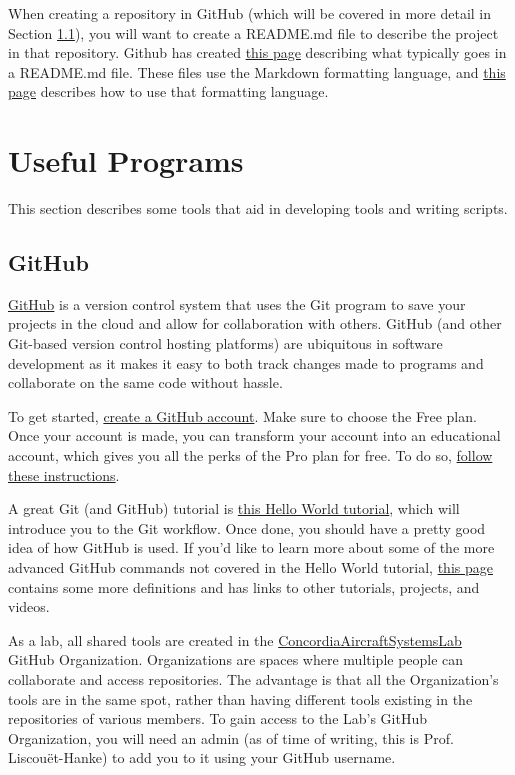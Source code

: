 \documentclass[letterpaper, 12pt]{article}
\begin{document}
When creating a repository in GitHub (which will be covered in more detail in Section \ref{github}), you will want to create a README.md file to describe the project in that repository. Github has created \href{https://help.github.com/en/github/creating-cloning-and-archiving-repositories/about-readmes}{this page} describing what typically goes in a README.md file. These files use the Markdown formatting language, and \href{https://help.github.com/en/github/writing-on-github/basic-writing-and-formatting-syntax}{this page} describes how to use that formatting language.

\section{Useful Programs}
This section describes some tools that aid in developing tools and writing scripts.
\subsection{GitHub}\label{github}
\href{https://github.com/}{GitHub} is a version control system that uses the Git program to save your projects in the cloud and allow for collaboration with others. GitHub (and other Git-based version control hosting platforms) are ubiquitous in software development as it makes it easy to both track changes made to programs and collaborate on the same code without hassle.

To get started, \href{https://github.com/join}{create a GitHub account}. Make sure to choose the Free plan. Once your account is made, you can transform your account into an educational account, which gives you all the perks of the Pro plan for free. To do so, \href{https://help.github.com/en/github/teaching-and-learning-with-github-education/applying-for-a-student-developer-pack}{follow these instructions}.

A great Git (and GitHub) tutorial is \href{https://guides.github.com/activities/hello-world/}{this Hello World tutorial}, which will introduce you to the Git workflow. 
Once done, you should have a pretty good idea of how GitHub is used. If you'd like to learn more about some of the more advanced GitHub commands not covered in the Hello World tutorial, \href{https://guides.github.com/introduction/git-handbook/}{this page} contains some more definitions and has links to other tutorials, projects, and videos.

As a lab, all shared tools are created in the \href{https://github.com/ConcordiaAircraftSystemsLab}{ConcordiaAircraftSystemsLab} GitHub Organization. Organizations are spaces where multiple people can collaborate and access repositories. The advantage is that all the Organization's tools are in the same spot, rather than having different tools existing in the repositories of various members. To gain access to the Lab's GitHub Organization, you will need an admin (as of time of writing, this is Prof. Liscou{\"e}t-Hanke) to add you to it using your GitHub username.
\end{document}
